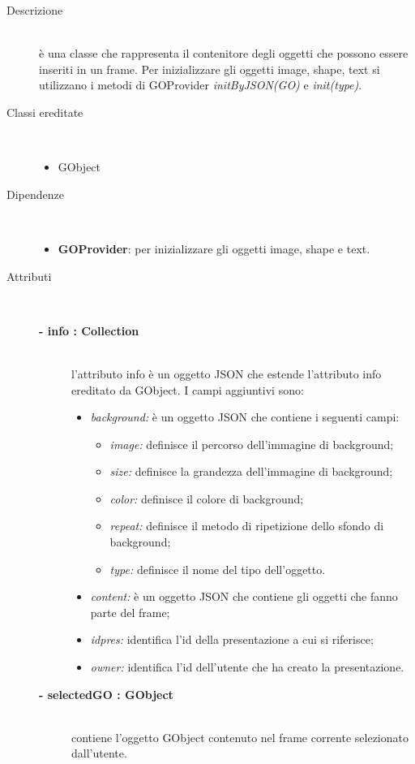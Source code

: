 \begin{description}
\item[Descrizione] \hfill \\
	è una classe che rappresenta il contenitore degli oggetti che possono essere inseriti in un frame. Per inizializzare gli oggetti image, shape, text si utilizzano i metodi di GOProvider \textit{initByJSON(GO)} e \textit{init(type)}. 
	
	\item[Classi ereditate] \hfill \\
	\begin{itemize}
		\item GObject
	\end{itemize}
	
	\item[Dipendenze] \hfill \\
	\begin{itemize}
		\item \textbf{GOProvider}: per inizializzare gli oggetti image, shape e text.
	\end{itemize}
	
\item[Attributi] \hfill \\
	\begin{description}
		\item[\textbf{- info : Collection			}] \hfill \\
			l'attributo info è un oggetto JSON che estende l'attributo info ereditato da GObject. I campi aggiuntivi sono:
	\begin{itemize}
		\item \textit{background:} è un oggetto JSON che contiene i seguenti campi:
		\begin{itemize}
			\item \textit{image:} definisce il percorso dell'immagine di background;
			\item \textit{size:} definisce la grandezza dell'immagine di background;
			\item \textit{color:} definisce il colore di background;
			\item \textit{repeat:} definisce il metodo di ripetizione dello sfondo di background;
			\item \textit{type:} definisce il nome del tipo dell'oggetto.
		\end{itemize}		
		\item \textit{content:} è un oggetto JSON che contiene gli oggetti che fanno parte del frame;
		\item \textit{idpres:} identifica l'id della presentazione a cui si riferisce;
		\item \textit{owner:} identifica l'id dell'utente che ha creato la presentazione.
	\end{itemize}
	\end{description}
	\begin{description}
		\item[\textbf{- selectedGO : GObject			}] \hfill \\
			contiene l'oggetto GObject contenuto nel frame corrente selezionato dall'utente.  
	\end{description}
	

\end{description}

